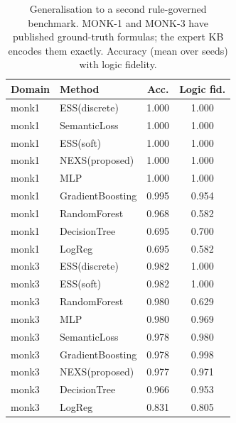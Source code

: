 \begin{table}[t]\centering\small
\caption{Generalisation to a second rule-governed benchmark. MONK-1 and MONK-3 have published ground-truth formulas; the expert KB encodes them exactly. Accuracy (mean over seeds) with logic fidelity.}
\label{tab:monk}
\begin{tabular}{llcc}
\toprule
Domain & Method & Acc. & Logic fid. \\
\midrule
monk1 & ESS(discrete) & 1.000 & 1.000 \\
monk1 & SemanticLoss & 1.000 & 1.000 \\
monk1 & ESS(soft) & 1.000 & 1.000 \\
monk1 & NEXS(proposed) & 1.000 & 1.000 \\
monk1 & MLP & 1.000 & 1.000 \\
monk1 & GradientBoosting & 0.995 & 0.954 \\
monk1 & RandomForest & 0.968 & 0.582 \\
monk1 & DecisionTree & 0.695 & 0.700 \\
monk1 & LogReg & 0.695 & 0.582 \\
monk3 & ESS(discrete) & 0.982 & 1.000 \\
monk3 & ESS(soft) & 0.982 & 1.000 \\
monk3 & RandomForest & 0.980 & 0.629 \\
monk3 & MLP & 0.980 & 0.969 \\
monk3 & SemanticLoss & 0.978 & 0.980 \\
monk3 & GradientBoosting & 0.978 & 0.998 \\
monk3 & NEXS(proposed) & 0.977 & 0.971 \\
monk3 & DecisionTree & 0.966 & 0.953 \\
monk3 & LogReg & 0.831 & 0.805 \\
\end{tabular}
\end{table}
